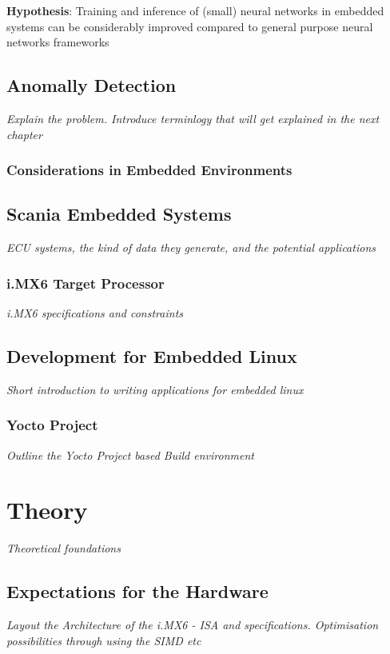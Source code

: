 \vspace{1em}
\noindent \textbf{Hypothesis}: Training and inference of (small) neural networks in embedded systems can be considerably improved compared to general purpose neural networks frameworks

\section{Anomally Detection}
\textit{Explain the problem. Introduce terminlogy that will get explained in the next chapter}

{\color{blue}
\subsection{Considerations in Embedded Environments}
}

\section{Scania Embedded Systems}
\textit{ECU systems, the kind of data they generate, and the potential applications}

\subsection{i.MX6 Target Processor}
\textit{i.MX6 specifications and constraints}

\section{Development for Embedded Linux}
\textit{Short introduction to writing applications for embedded linux}

\subsection{Yocto Project}
\textit{Outline the Yocto Project based Build environment}

\chapter{Theory}
\textit{Theoretical foundations}

\section{Expectations for the Hardware}
\textit{Layout the Architecture of the i.MX6 - ISA and specifications. Optimisation possibilities through using the SIMD etc}

